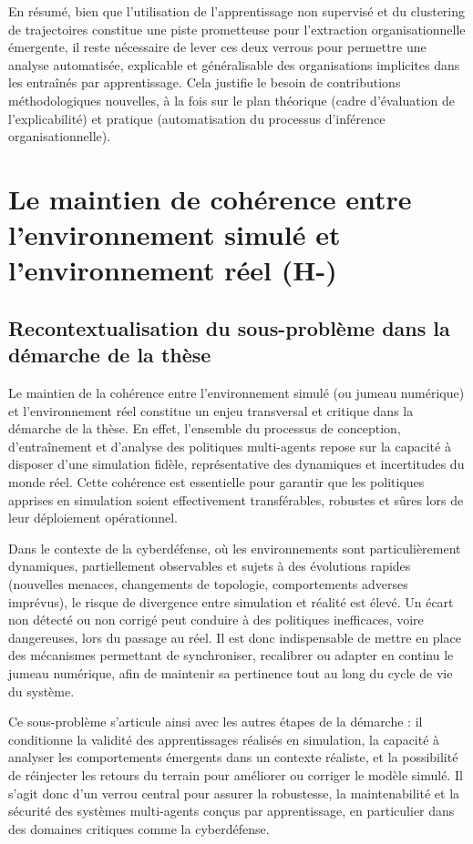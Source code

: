 En résumé, bien que l’utilisation de l’apprentissage non supervisé et du clustering de trajectoires constitue une piste prometteuse pour l’extraction organisationnelle émergente, il reste nécessaire de lever ces deux verrous pour permettre une analyse automatisée, explicable et généralisable des organisations implicites dans les  entraînés par apprentissage. Cela justifie le besoin de contributions méthodologiques nouvelles, à la fois sur le plan théorique (cadre d’évaluation de l’explicabilité) et pratique (automatisation du processus d’inférence organisationnelle).



\section{Le maintien de cohérence entre l'environnement simulé et l'environnement réel (H-)}

\subsection*{Recontextualisation du sous-problème dans la démarche de la thèse}

Le maintien de la cohérence entre l'environnement simulé (ou jumeau numérique) et l'environnement réel constitue un enjeu transversal et critique dans la démarche de la thèse. En effet, l'ensemble du processus de conception, d'entraînement et d'analyse des politiques multi-agents repose sur la capacité à disposer d'une simulation fidèle, représentative des dynamiques et incertitudes du monde réel. Cette cohérence est essentielle pour garantir que les politiques apprises en simulation soient effectivement transférables, robustes et sûres lors de leur déploiement opérationnel.

Dans le contexte de la cyberdéfense, où les environnements sont particulièrement dynamiques, partiellement observables et sujets à des évolutions rapides (nouvelles menaces, changements de topologie, comportements adverses imprévus), le risque de divergence entre simulation et réalité est élevé. Un écart non détecté ou non corrigé peut conduire à des politiques inefficaces, voire dangereuses, lors du passage au réel. Il est donc indispensable de mettre en place des mécanismes permettant de synchroniser, recalibrer ou adapter en continu le jumeau numérique, afin de maintenir sa pertinence tout au long du cycle de vie du système.

Ce sous-problème s'articule ainsi avec les autres étapes de la démarche : il conditionne la validité des apprentissages réalisés en simulation, la capacité à analyser les comportements émergents dans un contexte réaliste, et la possibilité de réinjecter les retours du terrain pour améliorer ou corriger le modèle simulé. Il s'agit donc d'un verrou central pour assurer la robustesse, la maintenabilité et la sécurité des systèmes multi-agents conçus par apprentissage, en particulier dans des domaines critiques comme la cyberdéfense.

